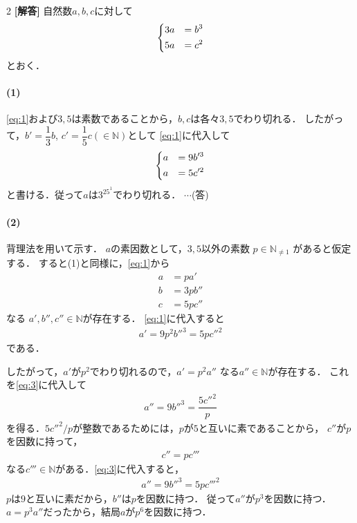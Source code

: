 \documentclass[../../main.tex]{subfiles}
\begin{document}
\setcounter{equation}{0}
\setcounter{figure}{0}
\setcounter{table}{0}
\begin{oframed}
  
\end{oframed}

\setlength{\columnseprule}{0.4pt}
\begin{multicols}{2}
  {\bf [解答]}
  自然数$a,b,c$に対して
  \begin{align}
    \begin{dcases}
      3a & =b^3 \\
      5a & =c^2
    \end{dcases}\label{eq:1}
  \end{align}
  とおく．

  \paragraph{(1)}
  \cref{eq:1}および$3,5$は素数であることから，$b,c$は各々$3,5$でわり切れる．
  したがって，$b'=\dfrac{1}{3}b$, $c'=\dfrac{1}{5}c ( \in \mathbb{N} )$として
  \cref{eq:1}に代入して
  \begin{align}
    \begin{dcases}
      a & =9b'^3 \\
      a & =5c'^2
    \end{dcases} \label{eq:2}
  \end{align}
  と書ける．従って$a$は$3^25^1$でわり切れる． $\cdots$(答)

  \paragraph{(2)}
  背理法を用いて示す．
  $a$の素因数として，$3,5$以外の素数 $p \in \mathbb{N}_{\ne 1}$ があると仮定する．
  すると(1)と同様に，\cref{eq:1}から
  \begin{align}
    a & =p a'   \\
    b & =3p b'' \\
    c & =5p c''
  \end{align}
  なる $a',b'',c'' \in \mathbb{N}$が存在する．
  \cref{eq:1}に代入すると
  \begin{align}
    a'=9p^2b''^3 = 5pc''^2 \label{eq:3}
  \end{align}
  である．

  したがって，$a'$が$p^2$でわり切れるので，$a'=p^{2}a''$ なる$a'' \in \mathbb{N}$が存在する．
  これを\cref{eq:3}に代入して
  \begin{align}
    a''=9b''^3 = \dfrac{5 c''^2}{p}
  \end{align}
  を得る．$5c''^2/p$が整数であるためには，$p$が$5$と互いに素であることから，
  $c''$が$p$を因数に持って，
  \begin{align}
    c'' = p c'''
  \end{align}
  なる$c'''\in\mathbb{N}$がある．\cref{eq:3}に代入すると，
  \begin{align}
    a''=9b''^3 = 5pc'''^2
  \end{align}
  $p$は$9$と互いに素だから，$b''$は$p$を因数に持つ．
  従って$a''$が$p^3$を因数に持つ．
  $a=p^{3}a''$だったから，結局$a$が$p^6$を因数に持つ．


\end{multicols}
\end{document}
